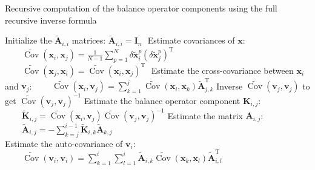 \documentclass[12pt]{article}
\DeclareMathOperator{\Cov}{Cov}
\begin{document}
\begin{algorithm}[!ht]
\caption{Recursive computation of the balance operator components using the full recursive inverse formula \label{algo:full}}
\begin{algorithmic}
\STATE Initialize the $\widetilde{\mathbf{A}}_{i,i}$ matrices:
\STATE $\widetilde{\mathbf{A}}_{i,i} = \mathbf{I}_n$
\ENDFOR
\STATE $ $
\STATE Estimate covariances of $\mathbf{x}$:
\STATE $\displaystyle \qquad \widetilde{\Cov}\left(\mathbf{x}_i,\mathbf{x}_j\right) = \frac{1}{N-1} \sum_{p=1}^N \delta \widetilde{\mathbf{x}}^p_i \left(\delta \widetilde{\mathbf{x}}^p_j\right)^\mathrm{T}$
\STATE $\displaystyle \qquad \widetilde{\Cov}\left(\mathbf{x}_j,\mathbf{x}_i\right) = \widetilde{\Cov}\left(\mathbf{x}_i,\mathbf{x}_j\right)^\mathrm{T}$
\ENDFOR
\ENDFOR
\STATE $ $
\STATE Estimate the cross-covariance between $\mathbf{x}_i$ and $\mathbf{v}_j$:
\STATE $\displaystyle \qquad \widetilde{\Cov}\left(\mathbf{x}_i,\mathbf{v}_j\right) = \sum_{k=1}^j \widetilde{\Cov} \left(\mathbf{x}_i,\mathbf{x}_k\right) \widetilde{\mathbf{A}}_{j,k}^\mathrm{T}$
\STATE Inverse $\widetilde{\Cov}\left(\mathbf{v}_j,\mathbf{v}_j\right)$ to get $\widetilde{\Cov} \left(\mathbf{v}_j,\mathbf{v}_j\right)^{-1}$
\STATE Estimate the balance operator component $\mathbf{K}_{i,j}$:
\STATE $\displaystyle \qquad \widetilde{\mathbf{K}}_{i,j} = \widetilde{\Cov} \left(\mathbf{x}_i,\mathbf{v}_j\right)\widetilde{\Cov} \left(\mathbf{v}_j,\mathbf{v}_j\right)^{-1}$
\STATE Estimate the matrix $\mathbf{A}_{i,j}$:
\STATE $\displaystyle \qquad \widetilde{\mathbf{A}}_{i,j} = - \sum_{k=j}^{i-1} \widetilde{\mathbf{K}}_{i,k} \widetilde{\mathbf{A}}_{k,j}$
\ENDFOR
\STATE $  $\\
\STATE Estimate the auto-covariance of $\mathbf{v}_i$:
\STATE $\displaystyle \qquad \widetilde{\Cov}\left(\mathbf{v}_i,\mathbf{v}_i\right) = \sum_{k=1}^i \sum_{l=1}^i \widetilde{\mathbf{A}}_{i,k} \widetilde{\Cov}\left(\mathbf{x}_k,\mathbf{x}_l\right) \widetilde{\mathbf{A}}_{i,l}^\mathrm{T}$
\ENDFOR
\end{algorithmic}
\end{algorithm}
\end{document}
